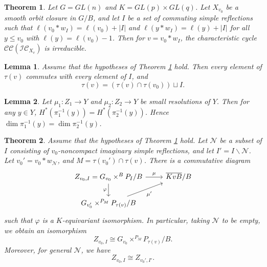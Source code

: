 \documentclass[10pt,a4paper]{amsart}
\newtheorem{theorem}{Theorem}
\newtheorem{lemma}{Lemma}
\newcommand{\CC}{\cC \cC}
\newcommand{\IC}{\cI \cC}
\newcommand{\cC}{\mathcal C}
\newcommand{\cI}{\mathcal I}
\newcommand{\cN}{\mathcal N}
\begin{document}
\begin{theorem} \label{t:irreducible}
Let $G = GL(n)$ and $K = GL(p) \times GL(q)$.  Let $X_{v_0}$ be a smooth orbit closure in $G/B$, and let $I$ be a set of commuting simple reflections such that 
$\ell(v_0* w_I) = \ell(v_0)+ |I|$ and $\ell(y* w_I) = \ell(y) + |I|$ for all $y \leq v_0$ with $\ell(y) = \ell(v_0) - 1$.  Then for $v=v_0*w_I$, the characteristic
cycle $\CC(\IC_{X_v})$ is irreducible.
\end{theorem}

\begin{lemma} \label{l:tau}
Assume that the hypotheses of Theorem \ref{t:irreducible}  hold.  Then 
every element of $\tau(v)$
commutes with every element of $I$, and
\begin{equation} \label{e:tau}
\tau(v) = (\tau(v) \cap \tau(v_0)) \sqcup I.
\end{equation}
\end{lemma}

\begin{lemma} \label{l:fiber-small}
Let $\mu_1: Z_1 \to Y$ and $\mu_2: Z_2 \to Y$ be small resolutions of $Y$.  Then for any $y \in Y$,
$H^*(\pi_1^{-1}(y)) = H^*(\pi_2^{-1}(y))$.  Hence $\dim \pi_1^{-1}(y) = \dim \pi_2^{-1}(y)$.
\end{lemma}

\begin{theorem}\label{t:symmetric-mu}
Assume that the hypotheses of Theorem \ref{t:irreducible}  hold.
Let $\cN$ be a subset of $I$ consisting of $v_0$-noncompact imaginary simple reflections, and
let $I' = I \smallsetminus \cN$.  
Let $v_0' = v_0 * w_{\cN}$, and \(M= \tau(v_0') \cap\tau(v)\).
There is a commutative diagram
\begin{equation}\label{e:symmetric-mu}
\begin{tikzcd}
Z_{v_0, I} = G_{v_0} \times^B P_I/B\arrow[r,"\mu"]\arrow[d,swap,"\varphi"]&\overline{KvB}/B\\
G_{v_0'} \times^{P_M} P_{\tau(v)}/B\arrow[ur,swap,"\mu'"]
\end{tikzcd}
\end{equation}
such that \(\varphi\) is a \(K\)-equivariant isomorphism.  In particular, taking $\cN$ to be empty,
we obtain an isomorphism
\begin{equation}\label{e:symmetric-mu2}
Z_{v_0, I} \cong G_{v_0} \times^{P_M} P_{\tau(v)}/B.
\end{equation}
Moreover, for general $\cN$, we have
\begin{equation}\label{e:symmetric-mu3}
Z_{v_0, I} \cong Z_{v_0', I'}.
\end{equation}
\end{theorem}
\end{document}
